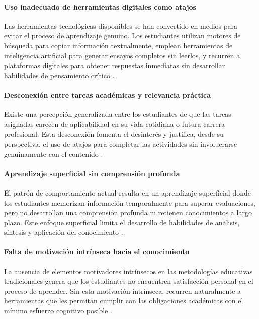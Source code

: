 \paragraph{Uso inadecuado de herramientas digitales como atajos}
Las herramientas tecnológicas disponibles se han convertido en medios para evitar el proceso de aprendizaje genuino. Los estudiantes utilizan motores de búsqueda para copiar información textualmente, emplean herramientas de inteligencia artificial para generar ensayos completos sin leerlos, y recurren a plataformas digitales para obtener respuestas inmediatas sin desarrollar habilidades de pensamiento crítico \cite{martinez2023}.

\paragraph{Desconexión entre tareas académicas y relevancia práctica}
Existe una percepción generalizada entre los estudiantes de que las tareas asignadas carecen de aplicabilidad en su vida cotidiana o futura carrera profesional. Esta desconexión fomenta el desinterés y justifica, desde su perspectiva, el uso de atajos para completar las actividades sin involucrarse genuinamente con el contenido \cite{nurhayati2025}.

\paragraph{Aprendizaje superficial sin comprensión profunda}
El patrón de comportamiento actual resulta en un aprendizaje superficial donde los estudiantes memorizan información temporalmente para superar evaluaciones, pero no desarrollan una comprensión profunda ni retienen conocimientos a largo plazo. Este enfoque superficial limita el desarrollo de habilidades de análisis, síntesis y aplicación del conocimiento \cite{rahmi2025}.

\paragraph{Falta de motivación intrínseca hacia el conocimiento}
La ausencia de elementos motivadores intrínsecos en las metodologías educativas tradicionales genera que los estudiantes no encuentren satisfacción personal en el proceso de aprender. Sin esta motivación intrínseca, recurren naturalmente a herramientas que les permitan cumplir con las obligaciones académicas con el mínimo esfuerzo cognitivo posible \cite{coelho2025}.

